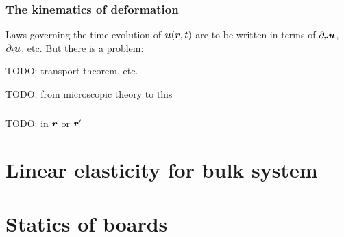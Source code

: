 \documentclass[hyperref, a4paper]{article}
\begin{document}
\subsubsection{The kinematics of deformation}

Laws governing the time evolution of $\vb*{u}(\vb*{r}, t)$
are to be written in terms of $\partial_{\vb*{r}} \vb*{u}$,
$\partial_t \vb*{u}$, etc.
But there is a problem: 


TODO: transport theorem, etc.

TODO: from microscopic theory to this

\subsubsection{}

TODO: in $\vb*{r}$ or $\vb*{r}'$

\section{Linear elasticity for bulk system}

\section{Statics of boards}

\printbibliography
\end{document}
